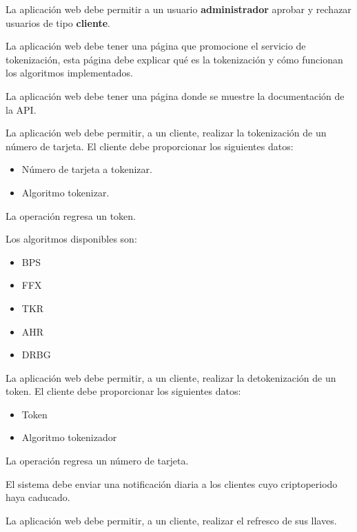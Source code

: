 {
  La aplicación web debe permitir a un usuario \textbf{administrador} aprobar
  y rechazar usuarios de tipo \textbf{cliente}.
}

{
  La aplicación web debe tener una página que promocione el servicio de
  tokenización, esta página debe explicar qué es la tokenización y cómo
  funcionan los algoritmos implementados.
}

{
  La aplicación web debe tener una página donde se muestre la documentación de la
  API.
}

{
  La aplicación web debe permitir, a un cliente, realizar la tokenización de un
  número de tarjeta. El cliente debe proporcionar los siguientes datos:
  \begin{itemize}
    \item Número de tarjeta a tokenizar.
    \item Algoritmo tokenizar.
  \end{itemize}
  La operación regresa un token.

  Los algoritmos disponibles son:
  \begin{itemize}
    \item BPS
    \item FFX
    \item TKR
    \item AHR
    \item DRBG
  \end{itemize}
}

{
  La aplicación web debe permitir, a un cliente, realizar la detokenización de
  un token. El cliente debe proporcionar los siguientes datos:
  \begin{itemize}
    \item Token
    \item Algoritmo tokenizador
  \end{itemize}
  La operación regresa un número de tarjeta.
}

{
  El sistema debe enviar una notificación diaria a los clientes cuyo
  criptoperiodo haya caducado.
}

{
  La aplicación web debe permitir, a un cliente, realizar el refresco de sus
  llaves.
}
